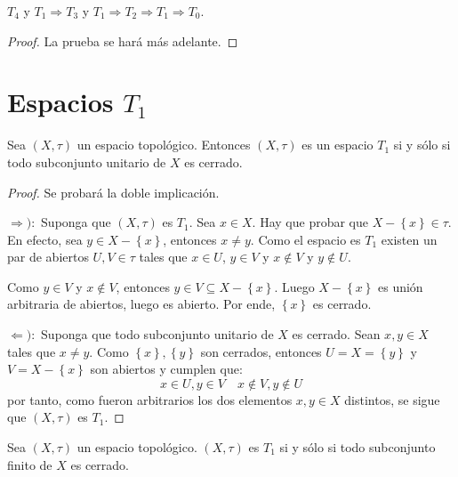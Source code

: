 \documentclass[12pt]{report}
\theoremstyle{largebreak}
\begin{document}
    \begin{propo}
        $T_4$ y $T_1\Rightarrow T_3$ y $T_1\Rightarrow T_2\Rightarrow T_1\Rightarrow T_0$.
    \end{propo}

    \begin{proof}
        La prueba se hará más adelante.
    \end{proof}

    \section{Espacios $T_1$}
    
    \begin{propo}
        Sea $(X,\tau)$ un espacio topológico. Entonces $(X,\tau)$ es un espacio $T_1$ si y sólo si todo subconjunto unitario de $X$ es cerrado.
    \end{propo}

    \begin{proof}
        Se probará la doble implicación.

        $\Rightarrow):$ Suponga que $(X,\tau)$ es $T_1$. Sea $x\in X$. Hay que probar que $X-\left\{x \right\}\in\tau$. En efecto, sea $y\in X-\left\{x \right\}$, entonces $x\neq y$. Como el espacio es $T_1$ existen un par de abiertos $U,V\in\tau$ tales que $x\in U$, $y\in V$ y $x\notin V$ y $y\notin U$.

        Como $y\in V$ y $x\notin V$, entonces $y\in V\subseteq X-\left\{x\right\}$. Luego $X-\left\{x\right\}$ es unión arbitraria de abiertos, luego es abierto. Por ende, $\left\{x\right\}$ es cerrado.

        $\Leftarrow):$ Suponga que todo subconjunto unitario de $X$ es cerrado. Sean $x,y\in X$ tales que $x\neq y$. Como $\left\{x\right\},\left\{y\right\}$ son cerrados, entonces $U=X=\left\{y\right\}$ y $V=X-\left\{x\right\}$ son abiertos y cumplen que:
        \begin{equation*}
            x\in U,y\in V\quad x\notin V,y\notin U
        \end{equation*}
        por tanto, como fueron arbitrarios los dos elementos $x,y\in X$ distintos, se sigue que $(X,\tau)$ es $T_1$.
    \end{proof}

    \begin{cor}
        Sea $(X,\tau)$ un espacio topológico. $(X,\tau)$ es $T_1$ si y sólo si todo subconjunto finito de $X$ es cerrado.
    \end{cor}
\end{document}
